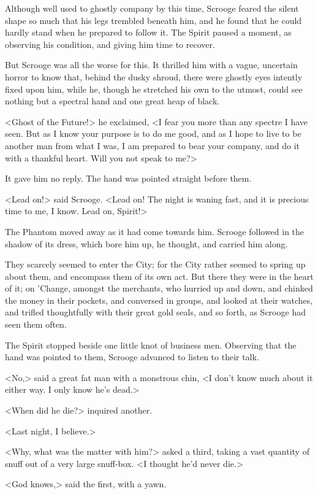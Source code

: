 Although well used to ghostly company by this time, Scrooge feared the silent
shape so much that his legs trembled beneath him, and he found that he could
hardly stand when he prepared to follow it. The Spirit paused a moment, as
observing his condition, and giving him time to recover.

But Scrooge was all the worse for this. It thrilled him with a vague, uncertain
horror to know that, behind the dusky shroud, there were ghostly eyes intently
fixed upon him, while he, though he stretched his own to the utmost, could see
nothing but a spectral hand and one great heap of black.

<Ghost of the Future!> he exclaimed, <I fear you more than any spectre I have
seen. But as I know your purpose is to do me good, and as I hope to live to be
another man from what I was, I am prepared to bear your company, and do it with
a thankful heart. Will you not speak to me?>

It gave him no reply. The hand was pointed straight before them.

<Lead on!> said Scrooge. <Lead on! The night is waning fast, and it is precious
time to me, I know. Lead on, Spirit!>

The Phantom moved away as it had come towards him. Scrooge followed in the
shadow of its dress, which bore him up, he thought, and carried him along.

They scarcely seemed to enter the City; for the City rather seemed to spring up
about them, and encompass them of its own act. But there they were in the heart
of it; on 'Change, amongst the merchants, who hurried up and down, and chinked
the money in their pockets, and conversed in groups, and looked at their
watches, and trifled thoughtfully with their great gold seals, and so forth, as
Scrooge had seen them often.

The Spirit stopped beside one little knot of business men. Observing that the
hand was pointed to them, Scrooge advanced to listen to their talk.

<No,> said a great fat man with a monstrous chin, <I don't know much about it
either way. I only know he's dead.>

<When did he die?> inquired another.

<Last night, I believe.>

<Why, what was the matter with him?> asked a third, taking a vast quantity of
snuff out of a very large snuff-box. <I thought he'd never die.>

<God knows,> said the first, with a yawn.

